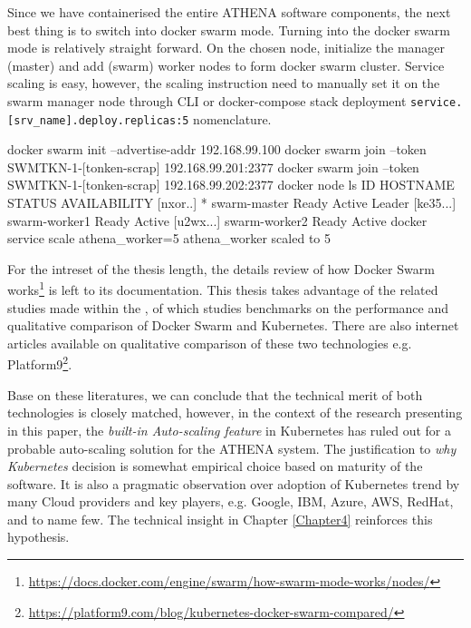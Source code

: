 Since we have containerised the entire ATHENA software components, the next best thing is to switch into docker swarm mode. Turning into the docker swarm mode is relatively straight forward. On the chosen node, initialize the manager (master) and add (swarm) worker nodes to form docker swarm cluster. Service scaling is easy, however, the scaling instruction need to manually set it on the swarm manager node through CLI or docker-compose stack deployment \verb|service.[srv_name].deploy.replicas:5| nomenclature.
\begin{small}
\begin{lcverbatim}
docker swarm init --advertise-addr 192.168.99.100
docker swarm join --token SWMTKN-1-[tonken-scrap] 192.168.99.201:2377
docker swarm join --token SWMTKN-1-[tonken-scrap] 192.168.99.202:2377
docker node ls
ID                            HOSTNAME         STATUS          AVAILABILITY
[nxor..] *   swarm-master        Ready          Active          Leader
[ke35...]    swarm-worker1       Ready          Active
[u2wx...]    swarm-worker2       Ready          Active
docker service scale athena_worker=5
athena_worker scaled to 5
\end{lcverbatim}
\end{small}

For the intreset of the thesis length, the details review of how Docker Swarm works\footnote{\url{https://docs.docker.com/engine/swarm/how-swarm-mode-works/nodes/}} is left to its documentation. This thesis takes advantage of the related studies made within the \textit{\groupname}, of which studies \parencite{swarmKubeBench2} benchmarks on the performance and qualitative comparison of Docker Swarm and Kubernetes. There are also internet articles available on qualitative comparison of these two technologies e.g. Platform9\footnote{\url{https://platform9.com/blog/kubernetes-docker-swarm-compared/}}. 

Base on these literatures, we can conclude that the technical merit of both technologies is closely matched, however, in the context of the research presenting in this paper, the \emph{built-in Auto-scaling feature} in Kubernetes has ruled out for a probable auto-scaling solution for the ATHENA system. The justification to \emph{why Kubernetes} decision is somewhat empirical choice based on maturity of the software. It is also a pragmatic observation over adoption of Kubernetes trend by many Cloud providers and key players, e.g. Google, IBM, Azure, AWS, RedHat, and to name few. The technical insight in Chapter \ref{Chapter4} reinforces this hypothesis.

